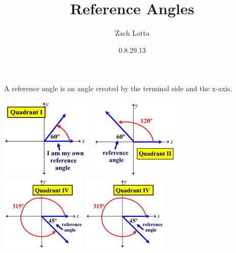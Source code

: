 \documentclass[12pt]{article}
\title{Reference Angles}
\author{Zach Latta}
\date{0.8.29.13}
\begin{document}
\maketitle

A reference angle is an angle created by the terminal side and the x-axis.

\includegraphics{assets/reference_angle_1.png}
\includegraphics{assets/reference_angle_2.png}
\includegraphics{assets/reference_angle_4.png}
\includegraphics{assets/reference_angle_4.png}
\end{document}
